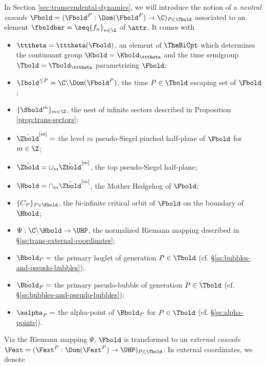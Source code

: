 \documentclass{amsart}
\begin{document}
In Section \ref{sec:transcendental-dynamics}, we will introduce the notion of a \emph{neutral cascade} $\Fbold = (\Fbold^P: \Dom(\Fbold^P) \to \C )_{P \in \Tbold}$ associated to an element $\fboldbar = \seq{ f_n }_{n \in \Z}$ of $\attr$.
It comes with
\begin{itemize}
    \item $\tttheta = \tttheta(\Fbold)$, an element of $\TheBiCpt$ which determines the continuant group $\Kbold = \Kbold_{\tttheta}$ and the time semigroup $\Tbold = \Tbold_{\tttheta}$ parametrizing $\Fbold$;
    \item $\Ibold^{\leq P} = \C \backslash \Dom(\Fbold^P)$, the time $P \in \Tbold$ escaping set of $\Fbold$;
    \item $\{ \Sbold^m \}_{m \in \Z}$, the nest of infinite sectors described in Proposition \ref{prop:trans-sectors};
    \item $\hat{\Zbold}^{[m]} = $ the level $m$ pseudo-Siegel pinched half-plane of $\Fbold$ for $m \in \Z$;
    \item $\hat{\Zbold} = \cup_m \hat{\Zbold}^{[m]}$, the top pseudo-Siegel half-plane;
    \item $\Hbold = \cap_m \hat{\Zbold}^{[m]}$, the Mother Hedgehog of $\Fbold$;
    \item $\{ C_P \}_{P \in \Kbold}$, the bi-infinite critical orbit of $\Fbold$ on the boundary of $\Hbold$;
    \item $\Psi: \C \backslash \Hbold \to \UHP$, the normalized Riemann mapping described in \S\ref{ss:trans-external-coordinates};
    \item $\Bbold_P = $ the primary hoglet of generation $P \in \Tbold$ (cf. \S\ref{ss:bubbles-and-pseudo-bubbles});
    \item $\hat{\Bbold}_P =$ the primary pseudo-bubble of generation $P \in \Tbold$ (cf. \S\ref{ss:bubbles-and-pseudo-bubbles});
    \item $\aalpha_P =$ the alpha-point of $\Bbold_P$ for $P \in \Tbold$ (cf. \S\ref{ss:alpha-points}).
\end{itemize}
Via the Riemann mapping $\Psi$, $\Fbold$ is transformed to an \emph{external cascade} $\Fext = (\Fext^P: \Dom(\Fext^P) \to \UHP)_{P \in \Tbold}$.
In external coordinates, we denote
\end{document}
